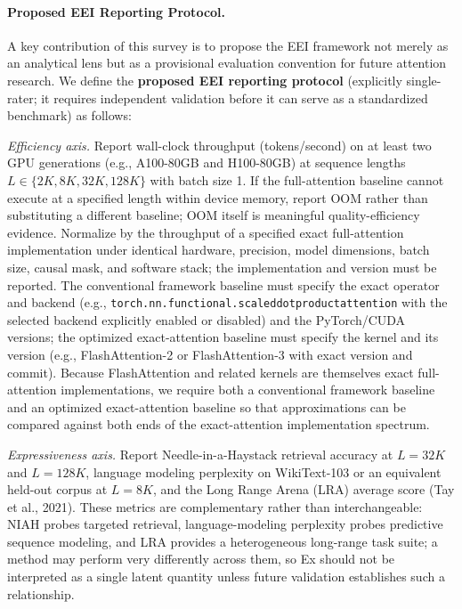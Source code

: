 \documentclass[10pt,twocolumn]{article}
\begin{document}


\paragraph{Proposed EEI Reporting Protocol.}
A key contribution of this survey is to propose the EEI framework not merely as an analytical lens but as a provisional evaluation convention for future attention research. We define the \textbf{proposed EEI reporting protocol} (explicitly single-rater; it requires independent validation before it can serve as a standardized benchmark) as follows:

\noindent\textit{Efficiency axis.} Report wall-clock throughput (tokens/second) on at least two GPU generations (e.g., A100-80GB and H100-80GB) at sequence lengths $L \in \{2K, 8K, 32K, 128K\}$ with batch size 1. If the full-attention baseline cannot execute at a specified length within device memory, report OOM rather than substituting a different baseline; OOM itself is meaningful quality-efficiency evidence. Normalize by the throughput of a specified exact full-attention implementation under identical hardware, precision, model dimensions, batch size, causal mask, and software stack; the implementation and version must be reported. The conventional framework baseline must specify the exact operator and backend (e.g., \texttt{torch.nn.functional.scaled\-dot\-product\-attention} with the selected backend explicitly enabled or disabled) and the PyTorch/CUDA versions; the optimized exact-attention baseline must specify the kernel and its version (e.g., FlashAttention-2 or FlashAttention-3 with exact version and commit). Because FlashAttention and related kernels are themselves exact full-attention implementations, we require both a conventional framework baseline and an optimized exact-attention baseline so that approximations can be compared against both ends of the exact-attention implementation spectrum.

\noindent\textit{Expressiveness axis.} Report Needle-in-a-Haystack retrieval accuracy at $L = 32K$ and $L = 128K$, language modeling perplexity on WikiText-103 or an equivalent held-out corpus at $L = 8K$, and the Long Range Arena (LRA) average score (Tay et al., 2021). These metrics are complementary rather than interchangeable: NIAH probes targeted retrieval, language-modeling perplexity probes predictive sequence modeling, and LRA provides a heterogeneous long-range task suite; a method may perform very differently across them, so Ex should not be interpreted as a single latent quantity unless future validation establishes such a relationship.
\end{document}
